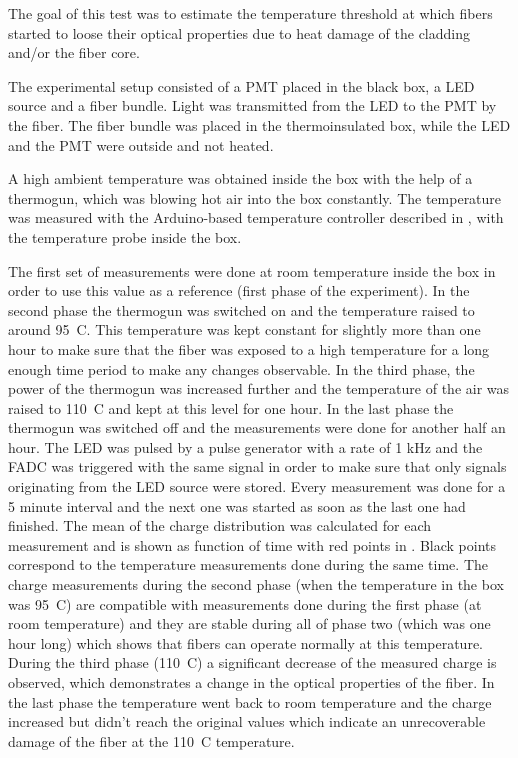 The goal of this test was to estimate the temperature threshold at which fibers started to loose their optical properties
due to heat damage of the cladding and/or the fiber core.

The experimental setup consisted of a PMT placed in the black box, a LED source and a fiber bundle.
Light was transmitted from the LED to the PMT by the fiber.
The fiber bundle was placed in the thermoinsulated box, while the LED and the PMT were outside and not heated.

A high ambient temperature was obtained inside the box with the help of a thermogun, which was blowing hot air into the box constantly.
The temperature was measured with the Arduino-based temperature controller described in , with the temperature probe inside the box.

The first set of measurements were done at room temperature inside the box in order to use this value as a reference (first phase of the experiment).
In the second phase the thermogun was switched on and the temperature raised to around 95\degree~C.
This temperature was kept constant for slightly more than one hour to make sure that the fiber was exposed to a high temperature for
a long enough time period to make any changes observable. 
In the third phase, the power of the thermogun was increased further and the temperature of the air was raised to 110\degree~C and kept at this level for one hour.
In the last phase the thermogun was switched off and the measurements were done for another half an hour.
The LED was pulsed by a pulse generator with a rate of 1 kHz and the FADC was triggered 
with the same signal in order to make sure that only signals originating from the LED source were stored.
Every measurement was done for a 5 minute interval and the next one was started as soon as the last one had finished.
The mean of the charge distribution was calculated for each measurement and is shown as function of time with red points in .
Black points correspond to the temperature measurements done during the same time.
The charge measurements during the second phase (when the temperature in the box was 95\degree~C) are compatible with measurements done during the first phase 
(at room temperature) and they are stable during all of phase two (which was one hour long) which shows that fibers can operate normally at this temperature.
During the third phase (110\degree~C) a significant decrease of the measured charge is observed, which demonstrates a change in the
optical properties of the fiber. In the last phase the temperature went back to room temperature and the charge increased but didn't reach 
the original values which indicate an unrecoverable damage of the fiber at the 110\degree~C temperature.

